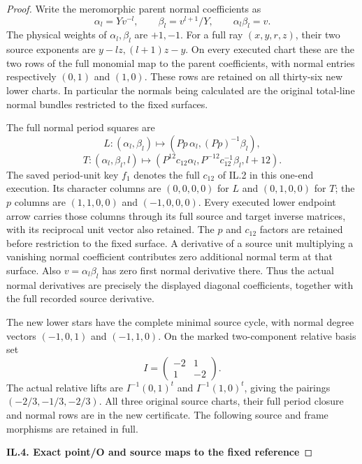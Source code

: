 \begin{proof}
Write the meromorphic parent normal coefficients as
\[
 \alpha_l=Yv^{-l},\qquad \beta_l=v^{l+1}/Y,\qquad
                     \alpha_l\beta_l=v.
 \tag{IL.6}
\]
The physical weights of \(\alpha_l,\beta_l\) are \(+1,-1\).
For a full ray \((x,y,r,z)\), their two source exponents are
\(y-lz,(l+1)z-y\). On every executed chart these are the two rows
of the full monomial map to the parent coefficients, with normal entries respectively
\((0,1)\) and \((1,0)\). These rows are retained on all thirty-six new lower charts.
In particular the normals being calculated are the original total-line
normal bundles restricted to the fixed surfaces.

The full normal period squares are
\[
 L:(\alpha_l,\beta_l)\longmapsto
       (Pp\,\alpha_l,(Pp)^{-1}\beta_l),
 \tag{IL.7}
\]
\[
 T:(\alpha_l,\beta_l,l)\longmapsto
   (P^{12}c_{12}\alpha_l,P^{-12}c_{12}^{-1}\beta_l,l+12).
 \tag{IL.8}
\]
The saved period-unit key \(f_1\) denotes the full \(c_{12}\)
of IL.2 in this one-end execution. Its character columns are
\((0,0,0,0)\) for \(L\) and \((0,1,0,0)\) for \(T\);
the \(p\) columns are \((1,1,0,0)\) and \((-1,0,0,0)\).
Every executed lower endpoint arrow carries those columns through
its full source and target inverse matrices, with its reciprocal
unit vector also retained.
The \(p\) and \(c_{12}\) factors are retained before restriction to
the fixed surface. A derivative of a source unit multiplying a
vanishing normal coefficient contributes zero additional normal
term at that surface. Also \(v=\alpha_l\beta_l\) has zero first
normal derivative there. Thus the actual normal derivatives are
precisely the displayed diagonal coefficients, together with the
full recorded source derivative.

\par

The new lower stars have the complete minimal source cycle, with
normal degree vectors \((-1,0,1)\) and \((-1,1,0)\).
On the marked two-component relative basis set
\[
 I=\begin{pmatrix}-2&1\\1&-2\end{pmatrix}.
\]
The actual relative lifts are \(I^{-1}(0,1)^t\) and
\(I^{-1}(1,0)^t\), giving the pairings
\((-2/3,-1/3,-2/3)\).  All three original source charts, their
full period closure and normal rows are in the new certificate.
The following source and frame morphisms are retained in full.

\medskip\noindent\textbf{IL.4. Exact point/O and source maps to the fixed reference}


\end{proof}
